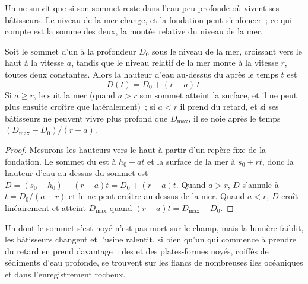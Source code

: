 Un  ne survit que si son sommet reste dans l'eau peu profonde où vivent ses
bâtisseurs. Le niveau de la mer change, et la fondation peut s'enfoncer~; ce qui compte est la
somme des deux, la montée relative du niveau de la mer.

\begin{proposition}\label{prop:b1:chemical-biogenic-sediments:keep-up}
Soit le sommet d'un  à la profondeur $D_0$ sous le niveau de la mer, croissant vers le haut à
la vitesse $a$, tandis que le niveau relatif de la mer monte à la vitesse $r$, toutes deux
constantes. Alors la hauteur d'eau au-dessus du  après le temps $t$ est
\[
D(t) = D_0 + (r - a)\,t .
\]
Si $a \ge r$, le  suit la mer (quand $a > r$ son sommet atteint la
surface, et il ne peut plus ensuite croître que latéralement)~; si $a < r$ il prend
du retard, et si ses bâtisseurs ne peuvent vivre plus profond que $D_{\max}$, il se noie après
le temps $(D_{\max} - D_0)/(r - a)$.
\end{proposition}

\begin{proof}
Mesurons les hauteurs vers le haut à partir d'un repère fixe de la fondation. Le sommet du 
est à $h_0 + a t$ et la surface de la mer à $s_0 + r t$, donc la hauteur d'eau au-dessus
du sommet est $D = (s_0 - h_0) + (r - a)t = D_0 + (r-a)t$. Quand $a > r$, $D$
s'annule à $t = D_0/(a-r)$ et le  ne peut croître au-dessus de la mer. Quand
$a < r$, $D$ croît linéairement et atteint $D_{\max}$ quand $(r-a)t = D_{\max} -
D_0$.
\end{proof}

Un  dont le sommet s'est noyé n'est pas mort sur-le-champ, mais la lumière faiblit, les
bâtisseurs changent et l'usine ralentit, si bien qu'un  qui commence à prendre
du retard en prend davantage~: des  et des plates-formes noyés, coiffés de sédiments d'eau
profonde, se trouvent sur les flancs de nombreuses îles océaniques et dans
l'enregistrement rocheux.

